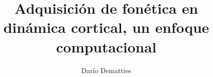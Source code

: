 \documentclass[a4paper,12pt,twoside]{report}
\begin{document}
\title{\LARGE {\bf Adquisición de fonética en dinámica cortical, un enfoque computacional}\\
 \vspace*{6mm}
}

\author{Dar\'io Dematties}

\normallinespacing
\maketitle

\preface

%
%
%

\body








\appendix




\end{document}
